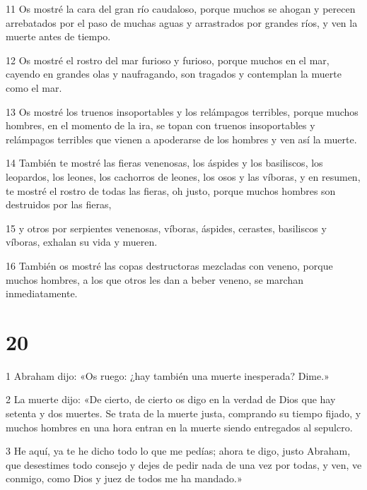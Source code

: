 \par 11 Os mostré la cara del gran río caudaloso, porque muchos se ahogan y perecen arrebatados por el paso de muchas aguas y arrastrados por grandes ríos, y ven la muerte antes de tiempo.

\par 12 Os mostré el rostro del mar furioso y furioso, porque muchos en el mar, cayendo en grandes olas y naufragando, son tragados y contemplan la muerte como el mar.

\par 13 Os mostré los truenos insoportables y los relámpagos terribles, porque muchos hombres, en el momento de la ira, se topan con truenos insoportables y relámpagos terribles que vienen a apoderarse de los hombres y ven así la muerte.

\par 14 También te mostré las fieras venenosas, los áspides y los basiliscos, los leopardos, los leones, los cachorros de leones, los osos y las víboras, y en resumen, te mostré el rostro de todas las fieras, oh justo, porque muchos hombres son destruidos por las fieras,

\par 15 y otros por serpientes venenosas, víboras, áspides, cerastes, basiliscos y víboras, exhalan su vida y mueren.

\par 16 También os mostré las copas destructoras mezcladas con veneno, porque muchos hombres, a los que otros les dan a beber veneno, se marchan inmediatamente.

\chapter{20}

\par 1 Abraham dijo: «Os ruego: ¿hay también una muerte inesperada? Dime.»

\par 2 La muerte dijo: «De cierto, de cierto os digo en la verdad de Dios que hay setenta y dos muertes. Se trata de la muerte justa, comprando su tiempo fijado, y muchos hombres en una hora entran en la muerte siendo entregados al sepulcro.

\par 3 He aquí, ya te he dicho todo lo que me pedías; ahora te digo, justo Abraham, que desestimes todo consejo y dejes de pedir nada de una vez por todas, y ven, ve conmigo, como Dios y juez de todos me ha mandado.»

